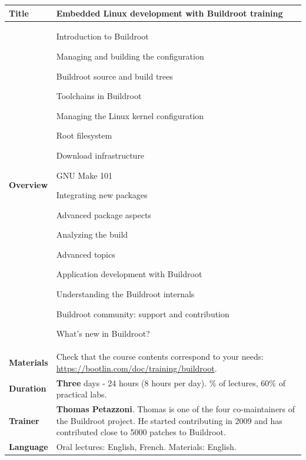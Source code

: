 \documentclass[a4paper,12pt,obeyspaces,spaces,hyphens]{article}
\begin{document}
\feshowtitle

 {
  \begin{tabularx}{\textwidth}{|g|h|}
    {\bf Title} & {\bf Embedded Linux development with Buildroot training} \\
    \hline

    {\bf Overview} &
    Introduction to Buildroot \par
    Managing and building the configuration \par
    Buildroot source and build trees \par
    Toolchains in Buildroot \par
    Managing the Linux kernel configuration \par
    Root filesystem \par
    Download infrastructure \par
    GNU Make 101 \par
    Integrating new packages \par
    Advanced package aspects \par
    Analyzing the build \par
    Advanced topics \par
    Application development with Buildroot \par
    Understanding the Buildroot internals \par
    Buildroot community: support and contribution \par
    What's new in Buildroot? \\
    \hline
    {\bf Materials} &
    Check that the course contents correspond to your needs:
    \newline \url{https://bootlin.com/doc/training/buildroot}. \\
    \hline

    {\bf Duration} & {\bf Three} days - 24 hours (8 hours per day).
    \% of lectures, 60\% of practical labs. \\
    \hline

    {\bf Trainer} & {\bf Thomas Petazzoni}. Thomas is one of the four
    co-maintainers of the Buildroot project. He started contributing
    in 2009 and has contributed close to 5000 patches to Buildroot.\\
    \hline

    {\bf Language} & Oral lectures: English, French.
    \newline Materials: English.\\
    \hline


\end{tabularx}}
\end{document}
